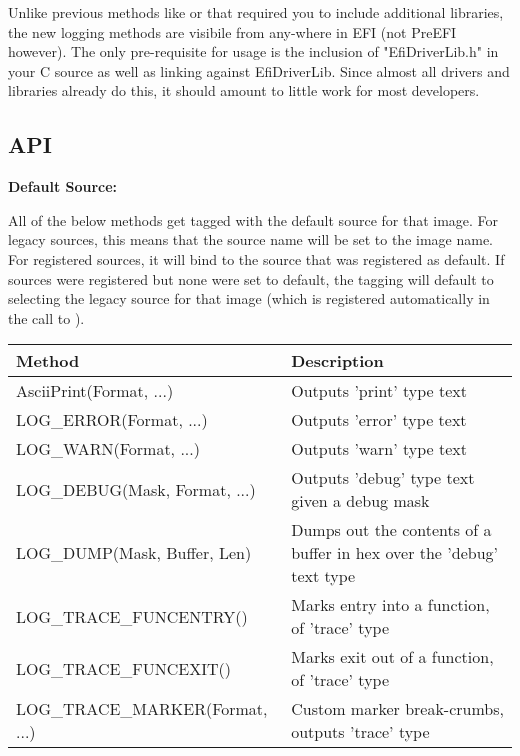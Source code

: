 Unlike previous methods like  or  that required you to include additional libraries, the new logging methods 
are visibile from any-where in EFI (not PreEFI however). The only pre-requisite for usage is the inclusion of "EfiDriverLib.h" in your C source as well 
as linking against EfiDriverLib. Since almost all drivers and libraries already do this, it should amount to little work for most developers. 

\subsection{API}
\label{sec:API}

\bfseries Default Source:
\mdseries

All of the below methods get tagged with the default source for that image. For legacy sources, this means that the source name 
will be set to the image name. For registered sources, it will bind to the source that was registered as default. If sources 
were registered but none were set to default, the tagging will default to selecting the legacy source for that image (which is registered automatically in the call to ). 

\medskip
\begin{tabu}[c]{| >{\footnotesize\ttfamily} p{2.0in} |  >{\small} p{3.85in} |}
    \hline
    \bfseries Method & \bfseries Description \\ \hline
    AsciiPrint(Format, ...) & Outputs 'print' type text \\
    LOG\_ERROR(Format, ...) & Outputs 'error' type text \\
    LOG\_WARN(Format, ...) & Outputs 'warn' type text \\
    LOG\_DEBUG(Mask, Format, ...) & Outputs 'debug' type text given a debug mask\\
    LOG\_DUMP(Mask, Buffer, Len) & Dumps out the contents of a buffer in hex over the 'debug' text type\\
    LOG\_TRACE\_FUNCENTRY() & Marks entry into a function, of 'trace' type \\
    LOG\_TRACE\_FUNCEXIT() & Marks exit out of a function, of 'trace' type \\
    LOG\_TRACE\_MARKER(Format, ...) & Custom marker break-crumbs, outputs 'trace' type \\
    \hline
\end{tabu}
\medskip

